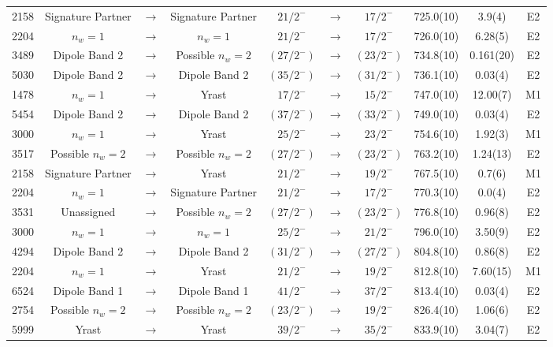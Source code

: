 \begin{landscape}
\begin{center}
\begin{longtable}{|c|ccc|ccc|c|c|c|}
 2158 &Signature Partner&$ \rightarrow $&Signature Partner&$ 21/2^{-} $&$ \rightarrow $&$ 17/2^{-} $& 725.0(10) & 3.9(4) & E2 \\
 2204 &$n_w=1$&$ \rightarrow $&$n_w=1$&$ 21/2^{-} $&$ \rightarrow $&$ 17/2^{-} $& 726.0(10) & 6.28(5) & E2 \\
 3489 &Dipole Band 2&$ \rightarrow $&Possible $n_w=2$&$ (27/2^{-}) $&$ \rightarrow $&$ (23/2^{-}) $& 734.8(10) & 0.161(20) & E2 \\
 5030 &Dipole Band 2&$ \rightarrow $&Dipole Band 2&$ (35/2^{-}) $&$ \rightarrow $&$ (31/2^{-}) $& 736.1(10) & 0.03(4) & E2 \\
 1478 &$n_w=1$&$ \rightarrow $&Yrast&$ 17/2^{-} $&$ \rightarrow $&$ 15/2^{-} $& 747.0(10) & 12.00(7) & M1 \\
 5454 &Dipole Band 2&$ \rightarrow $&Dipole Band 2&$ (37/2^{-}) $&$ \rightarrow $&$ (33/2^{-}) $& 749.0(10) & 0.03(4) & E2 \\
 3000 &$n_w=1$&$ \rightarrow $&Yrast&$ 25/2^{-} $&$ \rightarrow $&$ 23/2^{-} $& 754.6(10) & 1.92(3) & M1 \\
 3517 &Possible $n_w=2$&$ \rightarrow $&Possible $n_w=2$&$ (27/2^{-}) $&$ \rightarrow $&$ (23/2^{-}) $& 763.2(10) & 1.24(13) & E2 \\
 2158 &Signature Partner&$ \rightarrow $&Yrast&$ 21/2^{-} $&$ \rightarrow $&$ 19/2^{-} $& 767.5(10) & 0.7(6) & M1 \\
 2204 &$n_w=1$&$ \rightarrow $&Signature Partner&$ 21/2^{-} $&$ \rightarrow $&$ 17/2^{-} $& 770.3(10) & 0.0(4) & E2 \\
 3531 &Unassigned&$ \rightarrow $&Possible $n_w=2$&$ (27/2^{-}) $&$ \rightarrow $&$ (23/2^{-}) $& 776.8(10) & 0.96(8) & E2 \\
 3000 &$n_w=1$&$ \rightarrow $&$n_w=1$&$ 25/2^{-} $&$ \rightarrow $&$ 21/2^{-} $& 796.0(10) & 3.50(9) & E2 \\
 4294 &Dipole Band 2&$ \rightarrow $&Dipole Band 2&$ (31/2^{-}) $&$ \rightarrow $&$ (27/2^{-}) $& 804.8(10) & 0.86(8) & E2 \\
 2204 &$n_w=1$&$ \rightarrow $&Yrast&$ 21/2^{-} $&$ \rightarrow $&$ 19/2^{-} $& 812.8(10) & 7.60(15) & M1 \\
 6524 &Dipole Band 1&$ \rightarrow $&Dipole Band 1&$ 41/2^{-} $&$ \rightarrow $&$ 37/2^{-} $& 813.4(10) & 0.03(4) & E2 \\
 2754 &Possible $n_w=2$&$ \rightarrow $&Possible $n_w=2$&$ (23/2^{-}) $&$ \rightarrow $&$ 19/2^{-} $& 826.4(10) & 1.06(6) & E2 \\
 5999 &Yrast&$ \rightarrow $&Yrast&$ 39/2^{-} $&$ \rightarrow $&$ 35/2^{-} $& 833.9(10) & 3.04(7) & E2 \\

\end{longtable}
\end{center}
\end{landscape}
